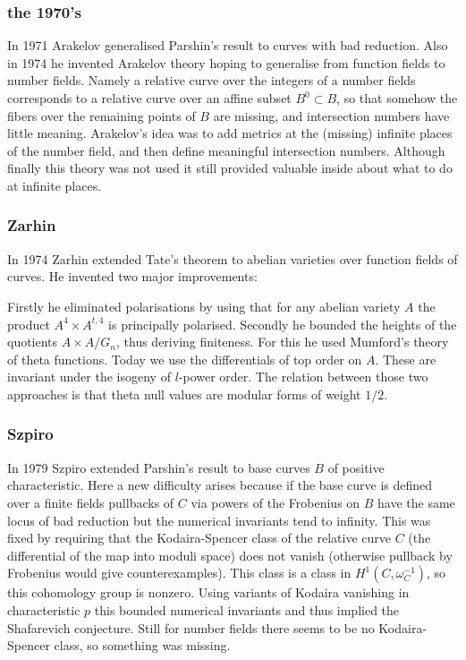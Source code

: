 \documentclass{beamer}
\begin{document}
\begin{frame}
\frametitle{the 1970's}
In 1971 Arakelov generalised Parshin's result to curves with bad reduction. Also in 1974 he invented Arakelov theory hoping to generalise from function fields to number fields. Namely a relative curve over the integers of a number fields corresponds to a relative curve over an affine subset $B^0 \subset B$, so that somehow the fibers over the remaining points of $B$ are missing, and intersection numbers have little meaning. Arakelov's idea was to add metrics at the (missing) infinite places of the number field, and then define meaningful intersection numbers. Although finally this theory was not used it still provided valuable inside about what to do at infinite places.
\end{frame}
\begin{frame}
\frametitle{Zarhin}
In 1974 Zarhin extended Tate's theorem to abelian varieties over function fields of curves. He invented two major improvements:

Firstly he eliminated polarisations by using that for any abelian variety $A$ the product $A^4 \times A^{t,4}$ is principally polarised. Secondly he bounded the heights of the quotients $A \times A/G_n$, thus deriving finiteness. For this he used Mumford's theory of theta functions. Today we use the differentials of top order on $A$. These are invariant under the isogeny of $l$-power order. The relation between those two approaches is that theta null values are modular forms of weight $1/2$.

\end{frame}
\begin{frame}
\frametitle{Szpiro}
In 1979 Szpiro extended Parshin's result to base  curves $B$ of positive characteristic. Here a new difficulty arises because if the base curve is defined over a finite fields pullbacks of $C$ via powers of the Frobenius on $B$ have the same locus of bad reduction but the numerical invariants tend to infinity. This was fixed by requiring that the Kodaira-Spencer class of the relative curve $C$ (the differential of the map into moduli space) does not vanish (otherwise pullback by Frobenius would give counterexamples). This class is a class in $H^1(C, \omega_C^{-1})$, so this cohomology group is nonzero. Using variants of Kodaira vanishing in characteristic $p$ this bounded numerical invariants and thus implied the Shafarevich conjecture. Still for number fields there seems to be no Kodaira-Spencer class, so something was missing.
\end{frame}
\end{document}
